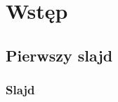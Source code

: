 \section{Wstęp}
\nextoc 

\subsection{Pierwszy slajd}
\begin{frame}
    \frametitle{Slajd}
\end{frame}

